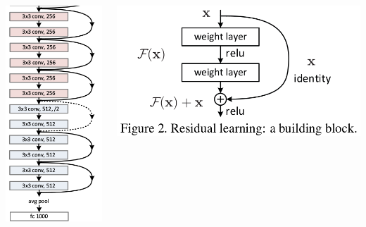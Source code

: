 \documentclass{beamer}
\begin{document}
\begin{frame}
\begin{columns}
\begin{column}{.1\textwidth}
\includegraphics[scale=.35]{resArch.png}
\end{column}
\begin{column}{.5\textwidth}
\includegraphics[width=1.3\textwidth]{resnet.png}
\end{column}
\end{columns}
\end{frame}
\end{document}
